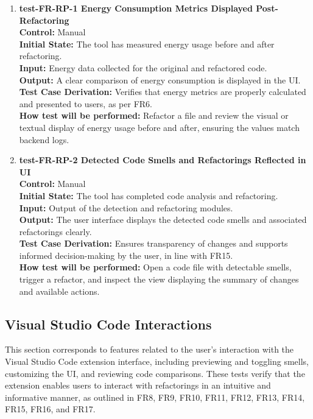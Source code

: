 \documentclass[12pt, titlepage]{article}
\begin{document}
\begin{enumerate}
  \item \textbf{test-FR-RP-1 Energy Consumption Metrics Displayed Post-Refactoring} \\[2mm]
    \textbf{Control:} Manual \\
    \textbf{Initial State:} The tool has measured energy usage before and after refactoring. \\
    \textbf{Input:} Energy data collected for the original and refactored code. \\
    \textbf{Output:} A clear comparison of energy consumption is displayed in the UI. \\
    \textbf{Test Case Derivation:} Verifies that energy metrics are properly calculated and presented to users, as per FR6. \\
    \textbf{How test will be performed:} Refactor a file and review the visual or textual display of energy usage before and after, ensuring the values match backend logs.

  \item \textbf{test-FR-RP-2 Detected Code Smells and Refactorings Reflected in UI} \\[2mm]
    \textbf{Control:} Manual \\
    \textbf{Initial State:} The tool has completed code analysis and refactoring. \\
    \textbf{Input:} Output of the detection and refactoring modules. \\
    \textbf{Output:} The user interface displays the detected code smells and associated refactorings clearly. \\
    \textbf{Test Case Derivation:} Ensures transparency of changes and supports informed decision-making by the user, in line with FR15. \\
    \textbf{How test will be performed:} Open a code file with detectable smells, trigger a refactor, and inspect the view displaying the summary of changes and available actions.
\end{enumerate}


\subsection{Visual Studio Code Interactions}

This section corresponds to features related to the user's interaction with the Visual Studio Code extension interface, including previewing and toggling smells, customizing the UI, and reviewing code comparisons. These tests verify that the extension enables users to interact with refactorings in an intuitive and informative manner, as outlined in FR8, FR9, FR10, FR11, FR12, FR13, FR14, FR15, FR16, and FR17.
\end{document}

